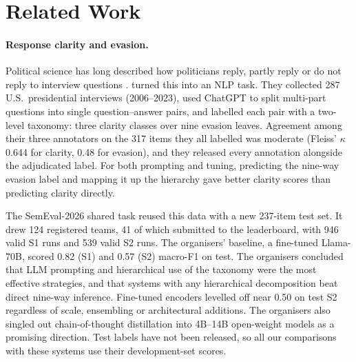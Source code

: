 \section{Related Work}\label{sec:related}

\paragraph{Response clarity and evasion.}
Political science has long described how politicians reply, partly reply or do not reply to interview questions \citep{bull1994identifying}.
\citet{thomas-etal-2024-never} turned this into an NLP task.
They collected 287 U.S.\ presidential interviews (2006--2023), used ChatGPT to split multi-part questions into single question--answer pairs, and labelled each pair with a two-level taxonomy: three clarity classes over nine evasion leaves.
Agreement among their three annotators on the 317 items they all labelled was moderate (Fleiss' $\kappa$ 0.644 for clarity, 0.48 for evasion), and they released every annotation alongside the adjudicated label.
For both prompting and tuning, predicting the nine-way evasion label and mapping it up the hierarchy gave better clarity scores than predicting clarity directly.

The SemEval-2026 shared task \citep{thomas-etal-2026-semeval} reused this data with a new 237-item test set.
It drew 124 registered teams, 41 of which submitted to the leaderboard, with 946 valid S1 runs and 539 valid S2 runs.
The organisers' baseline, a fine-tuned Llama-70B, scored 0.82 (S1) and 0.57 (S2) macro-F1 on test.
The organisers concluded that LLM prompting and hierarchical use of the taxonomy were the most effective strategies, and that systems with any hierarchical decomposition beat direct nine-way inference.
Fine-tuned encoders levelled off near 0.50 on test S2 regardless of scale, ensembling or architectural additions.
The organisers also singled out chain-of-thought distillation into 4B--14B open-weight models as a promising direction.
Test labels have not been released, so all our comparisons with these systems use their development-set scores.

